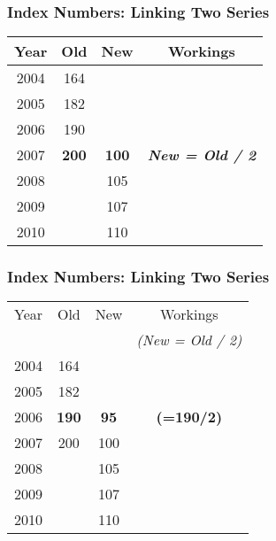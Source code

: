 \documentclass{beamer}
\begin{document}
\begin{frame}
\frametitle{Index Numbers: Linking Two Series}
\Large
\begin{center}
\begin{tabular}
{|c||c|c||c|}
\hline
Year	&\phantom{sp}	Old	\phantom{sp}&\phantom{sp}	New\phantom{sp}	&	Workings	\\ \hline \hline
2004	&	164	&		&		\\ \hline
2005	&	182	&		&		\\ \hline
2006	&	190	&		&		\\ \hline
2007	&	\textbf{200}	&	\textbf{100}	&	\textit{\textbf{New = Old / 2}}	\\ \hline
2008	&		&	105	&		\\ \hline
2009	&		&	107	&		\\ \hline
2010	&		&	110	&		\\ \hline
\end{tabular}  
\end{center}
\end{frame}

\begin{frame}
\frametitle{Index Numbers: Linking Two Series}
\Large
\begin{center}
\begin{tabular}
{|c||c|c||c|}
\hline
Year	&\phantom{sp}	Old	\phantom{sp}&\phantom{sp}	New\phantom{sp}	&	Workings	\\ 
	&&	&	\textit{(New = Old / 2)}	\\ 
\hline \hline

2004	&	164	&		&		\\ \hline
2005	&	182	&		&		\\ \hline
2006	&	\textbf{190}	&	\textbf{95}	&	\textbf{(=190/2)}	\\ \hline
2007	&	200	&	100	&		\\ \hline
2008	&		&	105	&		\\ \hline
2009	&		&	107	&		\\ \hline
2010	&		&	110	&		\\ \hline
\end{tabular}  
\end{center}
\end{frame}
\end{document}
